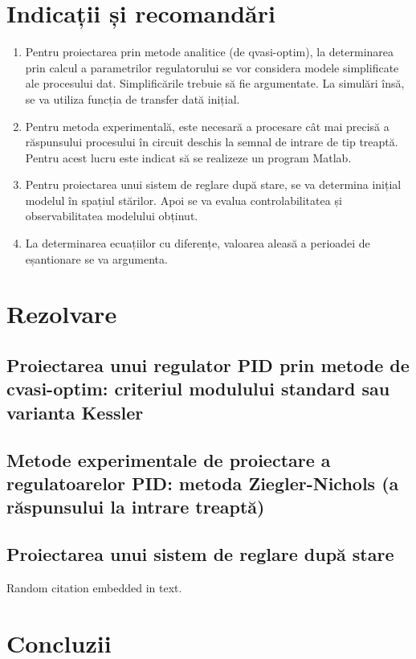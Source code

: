 \documentclass{article}
\begin{document}
\section{Indicații și recomandări}
\begin{enumerate}[label=\alph*)]
	\item Pentru proiectarea prin metode analitice (de qvasi-optim), la determinarea prin calcul a parametrilor regulatorului se vor considera modele simplificate ale procesului dat. Simplificările trebuie să fie argumentate. La simulări însă, se va utiliza funcția de transfer dată inițial.
	\item Pentru metoda experimentală, este necesară a procesare cât mai precisă a răspunsului procesului în circuit deschis la semnal de intrare de tip treaptă. Pentru acest lucru este indicat să se realizeze un program Matlab.
	\item Pentru proiectarea unui sistem de reglare după stare, se va determina inițial modelul în spațiul stărilor. Apoi se va evalua controlabilitatea și observabilitatea modelului obținut.
	\item La determinarea ecuațiilor cu diferențe, valoarea aleasă a perioadei de eșantionare se va argumenta.
\end{enumerate}

\section{Rezolvare}
\subsection{Proiectarea unui regulator PID prin metode de cvasi-optim: criteriul modulului standard sau varianta Kessler}
\subsection{Metode experimentale de proiectare a regulatoarelor PID: metoda Ziegler-Nichols (a răspunsului la intrare treaptă)}
\subsection{Proiectarea unui sistem de reglare după stare}
Random citation \cite{DUMMY:1} embedded in text.
\newpage

\section{Concluzii}

\newpage


\end{document}
